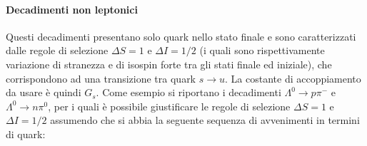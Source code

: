 \documentclass{subnucbo}
\begin{document}
\paragraph{Decadimenti non leptonici}
Questi decadimenti presentano solo quark nello stato finale e sono caratterizzati dalle regole di selezione $\Delta S = 1$ e $\Delta I = 1/2$ (i quali sono rispettivamente variazione di stranezza e di isospin forte tra gli stati finale ed iniziale), che corrispondono ad una transizione tra quark $s \rightarrow u$. La costante di accoppiamento da usare è quindi $G_{s}$. Come esempio si riportano i decadimenti $\Lambda ^ { 0 } \rightarrow p \pi ^ { - }$ e $\Lambda ^ { 0 } \rightarrow n \pi ^ { 0 }$, per i quali è possibile giustificare le regole di selezione $\Delta S = 1$ e $\Delta I = 1/2$ assumendo che si abbia la seguente sequenza di avvenimenti in termini di quark:
\end{document}
